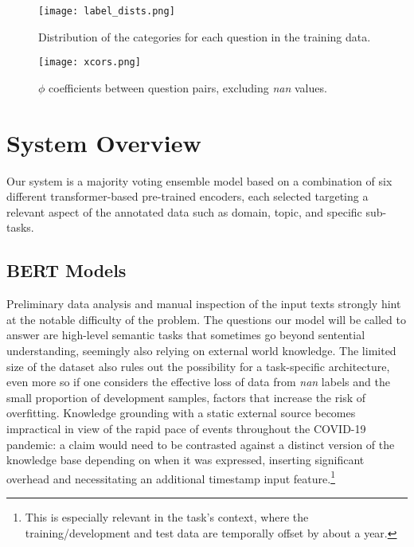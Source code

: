 \documentclass[11pt,a4paper]{article}
\begin{document}
\begin{figure}
    \centering
    \texttt{[image: label\_dists.png]}
    \caption{Distribution of the categories for each question in the training data.}
    \label{fig:labels_fig}
\end{figure}

\begin{figure}
    \centering
    \texttt{[image: xcors.png]}
    \caption{$\phi$ coefficients between question pairs, excluding \textit{nan} values.}
    \label{fig:xcors}
\end{figure}
    
\section{System Overview}
Our system is a majority voting ensemble model based on a combination of six different transformer-based pre-trained encoders, each selected targeting a relevant aspect of the annotated data such as domain, topic, and specific sub-tasks.

\subsection{BERT Models}

Preliminary data analysis and manual inspection of the input texts strongly hint at the notable difficulty of the problem.
The questions our model will be called to answer are high-level semantic tasks that sometimes go beyond sentential understanding, seemingly also relying on external world knowledge.
The limited size of the dataset also rules out the possibility for a task-specific architecture, even more so if one considers the effective loss of data from \textit{nan} labels and the small proportion of development samples, factors that increase the risk of overfitting.
Knowledge grounding with a static external source becomes impractical in view of the rapid pace of events throughout the COVID-19 pandemic: a claim would need to be contrasted against a distinct version of the knowledge base depending on when it was expressed, inserting significant overhead and necessitating an additional timestamp input feature.\footnote{This is especially relevant in the task's context, where the training/development and test data are temporally offset by about a year.}
\end{document}
